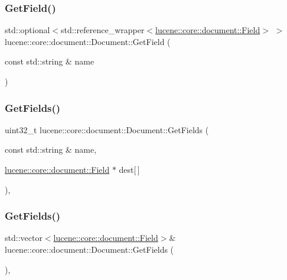 \subsubsection{\texorpdfstring{Get\+Field()}{GetField()}}
{\footnotesize\ttfamily std\+::optional$<$std\+::reference\+\_\+wrapper$<$\mbox{\hyperlink{classlucene_1_1core_1_1document_1_1Field}{lucene\+::core\+::document\+::\+Field}}$>$ $>$ lucene\+::core\+::document\+::\+Document\+::\+Get\+Field (\begin{DoxyParamCaption}\item[{const std\+::string \&}]{name }\end{DoxyParamCaption})\hspace{0.3cm}{\ttfamily [inline]}}

\mbox{\label{classlucene_1_1core_1_1document_1_1Document_a8fcbb281ebfb1a4a075e189d099d3617}} 
\subsubsection{\texorpdfstring{Get\+Fields()}{GetFields()}\hspace{0.1cm}{\footnotesize\ttfamily [1/2]}}
{\footnotesize\ttfamily uint32\+\_\+t lucene\+::core\+::document\+::\+Document\+::\+Get\+Fields (\begin{DoxyParamCaption}\item[{const std\+::string \&}]{name,  }\item[{\mbox{\hyperlink{classlucene_1_1core_1_1document_1_1Field}{lucene\+::core\+::document\+::\+Field}} $\ast$}]{dest\mbox{[}$\,$\mbox{]} }\end{DoxyParamCaption})\hspace{0.3cm}{\ttfamily [inline]}, {\ttfamily [noexcept]}}

\mbox{\label{classlucene_1_1core_1_1document_1_1Document_a1300520e8ac371b602712cfd279284b4}} 
\subsubsection{\texorpdfstring{Get\+Fields()}{GetFields()}\hspace{0.1cm}{\footnotesize\ttfamily [2/2]}}
{\footnotesize\ttfamily std\+::vector$<$\mbox{\hyperlink{classlucene_1_1core_1_1document_1_1Field}{lucene\+::core\+::document\+::\+Field}}$>$\& lucene\+::core\+::document\+::\+Document\+::\+Get\+Fields (\begin{DoxyParamCaption}{ }\end{DoxyParamCaption})\hspace{0.3cm}{\ttfamily [inline]}, {\ttfamily [noexcept]}}

